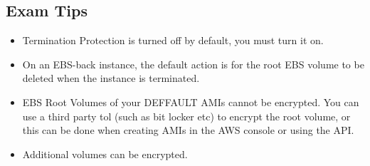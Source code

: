 \documentclass{article}
\begin{document}
\subsection{Exam Tips}
\begin{itemize}
\item
Termination Protection is turned off by default, you must turn it on.

\item
On an EBS-back instance, the default action is for the root EBS volume to be deleted when the instance is terminated.

\item
EBS Root Volumes of your DEFFAULT AMIs cannot be encrypted. You can use a third party tol (such as bit locker etc) to encrypt the root volume, or this can be done when creating AMIs in the AWS console or using the API.

\item
Additional volumes can be encrypted.
\end{itemize}
\end{document}
